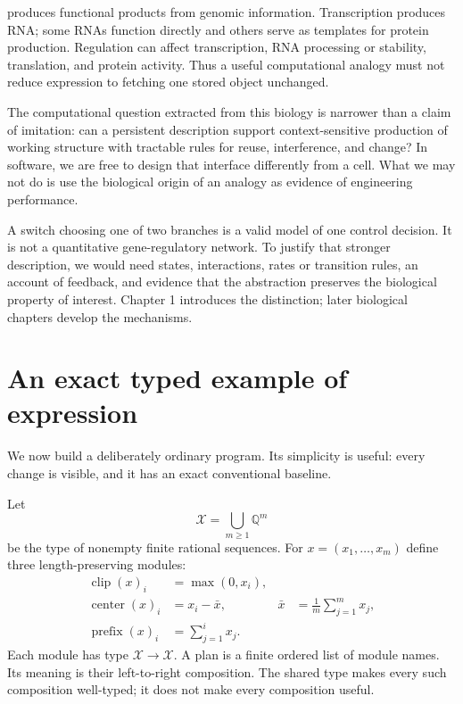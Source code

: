  produces functional products from genomic information. Transcription produces RNA; some RNAs function directly and others serve as templates for protein production.\cite{expression} Regulation can affect transcription, RNA processing or stability, translation, and protein activity.\cite{control} Thus a useful computational analogy must not reduce expression to fetching one stored object unchanged.


The computational question extracted from this biology is narrower than a claim of imitation: can a persistent description support context-sensitive production of working structure with tractable rules for reuse, interference, and change? In software, we are free to design that interface differently from a cell. What we may not do is use the biological origin of an analogy as evidence of engineering performance.

A switch choosing one of two branches is a valid model of one control decision. It is not a quantitative gene-regulatory network. To justify that stronger description, we would need states, interactions, rates or transition rules, an account of feedback, and evidence that the abstraction preserves the biological property of interest. Chapter 1 introduces the distinction; later biological chapters develop the mechanisms.

\section{An exact typed example of expression}\label{sec:example}
We now build a deliberately ordinary program. Its simplicity is useful: every change is visible, and it has an exact conventional baseline.

Let
\[
 \mathcal X=\bigcup_{m\ge1}\mathbb Q^m
\]
be the type of nonempty finite rational sequences. For $x=(x_1,\ldots,x_m)$ define three length-preserving modules:
\[
 \begin{aligned}
 \operatorname{clip}(x)_i&=\max(0,x_i),\\
 \operatorname{center}(x)_i&=x_i-\bar x,
       &\bar x&=\frac1m\sum_{j=1}^{m}x_j,\\
 \operatorname{prefix}(x)_i&=\sum_{j=1}^{i}x_j.
 \end{aligned}
\]
Each module has type $\mathcal X\to\mathcal X$. A plan is a finite ordered list of module names. Its meaning is their left-to-right composition. The shared type makes every such composition well-typed; it does not make every composition useful.

